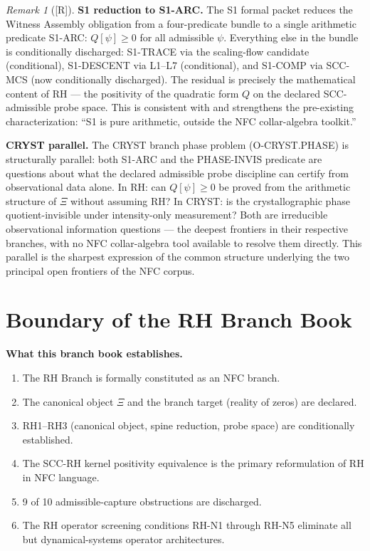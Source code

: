 \documentclass[12pt,oneside]{amsbook}
\theoremstyle{plain}
\theoremstyle{definition}
\theoremstyle{remark}
\newtheorem{remark}[theorem]{Remark}
\newcommand{\status}[1]{\textup{[#1]}}
\begin{document}
\begin{remark}[\status{R}]\label{rem:rh-s1-reduction}
\textbf{S1 reduction to S1-ARC.}
The S1 formal packet reduces the Witness Assembly obligation from a
four-predicate bundle to a single arithmetic predicate S1-ARC:
$Q[\psi]\ge0$ for all admissible $\psi$. Everything else in the
bundle is conditionally discharged: S1-TRACE via the scaling-flow
candidate (conditional), S1-DESCENT via L1--L7 (conditional), and
S1-COMP via SCC-MCS (now conditionally discharged). The residual
is precisely the mathematical content of RH --- the positivity of
the quadratic form $Q$ on the declared SCC-admissible probe space.
This is consistent with and strengthens the pre-existing
characterization: ``S1 is pure arithmetic, outside the NFC
collar-algebra toolkit.''

\textbf{CRYST parallel.} The CRYST branch phase problem
(O-CRYST.PHASE) is structurally parallel: both S1-ARC and
the PHASE-INVIS predicate are questions about what the declared
admissible probe discipline can certify from observational data
alone. In RH: can $Q[\psi]\ge0$ be proved from the arithmetic
structure of $\Xi$ without assuming RH? In CRYST: is the
crystallographic phase quotient-invisible under intensity-only
measurement? Both are irreducible observational information
questions --- the deepest frontiers in their respective branches,
with no NFC collar-algebra tool available to resolve them directly.
This parallel is the sharpest expression of the common structure
underlying the two principal open frontiers of the NFC corpus.
\end{remark}



\section{Boundary of the RH Branch Book}

\textbf{What this branch book establishes.}
\begin{enumerate}
 \item The RH Branch is formally constituted as an NFC branch.
 \item The canonical object $\Xi$ and the branch target (reality
 of zeros) are declared.
 \item RH1--RH3 (canonical object, spine reduction, probe space)
 are conditionally established.
 \item The SCC-RH kernel positivity equivalence is the primary
 reformulation of RH in NFC language.
 \item 9 of 10 admissible-capture obstructions are discharged.
 \item The RH operator screening conditions RH-N1 through RH-N5
 eliminate all but dynamical-systems operator architectures.
\end{enumerate}
\end{document}
